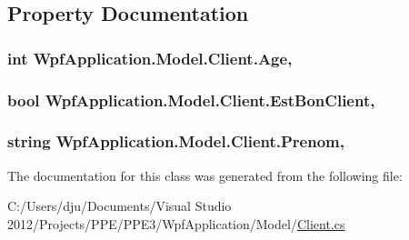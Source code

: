 \subsection{Property Documentation}
\hypertarget{class_wpf_application_1_1_model_1_1_client_a6f8385b0794898f510b0711eb2f69d20}{
\subsubsection[{Age}]{\setlength{\rightskip}{0pt plus 5cm}int Wpf\-Application.\-Model.\-Client.\-Age\hspace{0.3cm}{\ttfamily [get]}, {\ttfamily [set]}}}\label{class_wpf_application_1_1_model_1_1_client_a6f8385b0794898f510b0711eb2f69d20}
\hypertarget{class_wpf_application_1_1_model_1_1_client_a40ac23eaedeb2a7b54e626e0f5b205bc}{
\subsubsection[{Est\-Bon\-Client}]{\setlength{\rightskip}{0pt plus 5cm}bool Wpf\-Application.\-Model.\-Client.\-Est\-Bon\-Client\hspace{0.3cm}{\ttfamily [get]}, {\ttfamily [set]}}}\label{class_wpf_application_1_1_model_1_1_client_a40ac23eaedeb2a7b54e626e0f5b205bc}
\hypertarget{class_wpf_application_1_1_model_1_1_client_a3f49a129721a9bfffb482de1658c88f7}{
\subsubsection[{Prenom}]{\setlength{\rightskip}{0pt plus 5cm}string Wpf\-Application.\-Model.\-Client.\-Prenom\hspace{0.3cm}{\ttfamily [get]}, {\ttfamily [set]}}}\label{class_wpf_application_1_1_model_1_1_client_a3f49a129721a9bfffb482de1658c88f7}


The documentation for this class was generated from the following file\-:\begin{DoxyCompactItemize}
\item 
C\-:/\-Users/dju/\-Documents/\-Visual Studio 2012/\-Projects/\-P\-P\-E/\-P\-P\-E3/\-Wpf\-Application/\-Model/\hyperlink{_client_8cs}{Client.\-cs}\end{DoxyCompactItemize}
